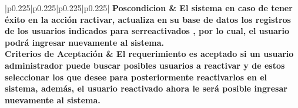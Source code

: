 \begin{center}
\begin{longtable}{|p{}|p{}|p{}|p{}|}
\hline
\bf Poscondicion &
{El sistema en caso de tener éxito en la acción ractivar, actualiza en su base de datos los registros de los usuarios indicados para serreactivados , por lo cual, el usuario podrá ingresar nuevamente al sistema. } \\
\hline
\bf Criterios de Aceptación &
{El requerimiento es aceptado si un usuario administrador puede buscar posibles usuarios a reactivar y de estos seleccionar los que desee para posteriormente reactivarlos en el sistema, además, el usuario reactivado ahora le será posible ingresar nuevamente al sistema. } \\
\hline
\end{longtable}
\end{center}
%